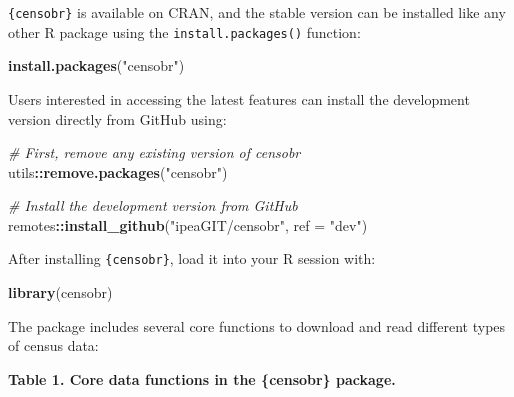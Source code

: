 \documentclass[
]{article}
\newenvironment{Shaded}{\begin{snugshade}}{\end{snugshade}}
\newcommand{\AttributeTok}[1]{\textcolor[rgb]{0.13,0.29,0.53}{#1}}
\newcommand{\CommentTok}[1]{\textcolor[rgb]{0.56,0.35,0.01}{\textit{#1}}}
\newcommand{\FunctionTok}[1]{\textcolor[rgb]{0.13,0.29,0.53}{\textbf{#1}}}
\newcommand{\NormalTok}[1]{#1}
\newcommand{\SpecialCharTok}[1]{\textcolor[rgb]{0.81,0.36,0.00}{\textbf{#1}}}
\newcommand{\StringTok}[1]{\textcolor[rgb]{0.31,0.60,0.02}{#1}}
\begin{document}
\texttt{\{censobr\}} is available on CRAN, and the stable version can be
installed like any other R package using the \texttt{install.packages()}
function:

\begin{Shaded}
\begin{Highlighting}[]
\FunctionTok{install.packages}\NormalTok{(}\StringTok{"censobr"}\NormalTok{)}
\end{Highlighting}
\end{Shaded}

Users interested in accessing the latest features can install the
development version directly from GitHub using:

\begin{Shaded}
\begin{Highlighting}[]
\CommentTok{\# First, remove any existing version of censobr}
\NormalTok{utils}\SpecialCharTok{::}\FunctionTok{remove.packages}\NormalTok{(}\StringTok{"censobr"}\NormalTok{)}

\CommentTok{\# Install the development version from GitHub}
\NormalTok{remotes}\SpecialCharTok{::}\FunctionTok{install\_github}\NormalTok{(}\StringTok{"ipeaGIT/censobr"}\NormalTok{, }\AttributeTok{ref =} \StringTok{"dev"}\NormalTok{)}
\end{Highlighting}
\end{Shaded}

After installing \texttt{\{censobr\}}, load it into your R session with:

\begin{Shaded}
\begin{Highlighting}[]
\FunctionTok{library}\NormalTok{(censobr)}
\end{Highlighting}
\end{Shaded}

The package includes several core functions to download and read
different types of census data:

\textbf{Table 1. Core data functions in the \{censobr\} package.}
\end{document}
